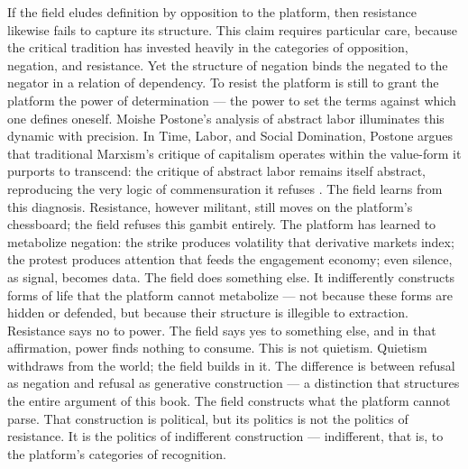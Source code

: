 If the field eludes definition by opposition to the platform, then resistance likewise fails to capture its structure. This claim requires particular care, because the critical tradition has invested heavily in the categories of opposition, negation, and resistance. Yet the structure of negation binds the negated to the negator in a relation of dependency. To resist the platform is still to grant the platform the power of determination — the power to set the terms against which one defines oneself. Moishe Postone’s analysis of abstract labor illuminates this dynamic with precision. In Time, Labor, and Social Domination, Postone argues that traditional Marxism’s critique of capitalism operates within the value-form it purports to transcend: the critique of abstract labor remains itself abstract, reproducing the very logic of commensuration it refuses \cite{postone_1993}. The field learns from this diagnosis. Resistance, however militant, still moves on the platform’s chessboard; the field refuses this gambit entirely. The platform has learned to metabolize negation: the strike produces volatility that derivative markets index; the protest produces attention that feeds the engagement economy; even silence, as signal, becomes data. The field does something else. It indifferently constructs forms of life that the platform cannot metabolize — not because these forms are hidden or defended, but because their structure is illegible to extraction. Resistance says no to power. The field says yes to something else, and in that affirmation, power finds nothing to consume. This is not quietism. Quietism withdraws from the world; the field builds in it. The difference is between refusal as negation and refusal as generative construction — a distinction that structures the entire argument of this book. The field constructs what the platform cannot parse. That construction is political, but its politics is not the politics of resistance. It is the politics of indifferent construction --- indifferent, that is, to the platform's categories of recognition.

